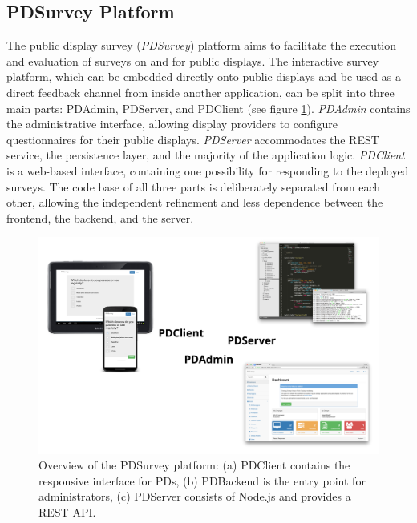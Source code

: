 

\subsection{PDSurvey Platform}

	The public display survey (\textit{PDSurvey}) platform aims to facilitate the execution and evaluation of surveys on and for public displays. 
	The interactive survey platform, which can be embedded directly onto public displays and be used as a direct feedback channel from inside another application, can be split into three main parts: PDAdmin, PDServer, and PDClient (see figure \ref{fig:4-pdsurvey-platform}). \textit{PDAdmin} contains the administrative interface, allowing display providers to configure questionnaires for their public displays. \textit{PDServer} accommodates the REST service, the persistence layer, and the majority of the application logic. \textit{PDClient} is a web-based interface, containing one possibility for responding to the deployed surveys. 
	The code base of all three parts is deliberately separated from each other, allowing the independent refinement and less dependence between the frontend, the backend, and the server.

	\begin{figure}[btph]
	    \begin{center}
	        \includegraphics[width=.8\columnwidth]{img/screenshots/pdsurvey-overview/pdsurvey-platform.png}
	    \end{center}
	 \caption[Overview of the \textit{PDSurvey} platform]{Overview of the PDSurvey platform: (a) PDClient contains the responsive interface for PDs, (b) PDBackend is the entry point for administrators, (c) PDServer consists of Node.js and provides a REST API. }
	 \label{fig:4-pdsurvey-platform}
	\end{figure}



